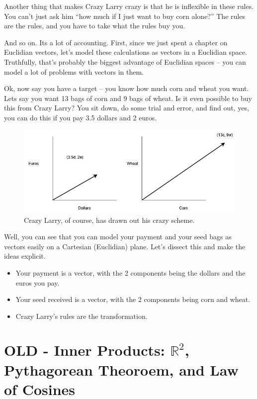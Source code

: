 \documentclass[
]{book}
\providecommand{\tightlist}{%
  \setlength{\itemsep}{0pt}\setlength{\parskip}{0pt}}
\begin{document}
Another thing that makes Crazy Larry crazy is that he is inflexible in these rules. You can't just ask him ``how much if I just want to buy corn alone?'' The rules are the rules, and you have to take what the rules buy you.

And so on. Its a lot of accounting. First, since we just spent a chapter on Euclidian vectors, let's model these calculations as vectors in a Euclidian space. Truthfully, that's probably the biggest advantage of Euclidian spaces -- you can model a lot of problems with vectors in them.

Ok, now say you have a target -- you know how much corn and wheat you want. Lets say you want 13 bags of corn and 9 bags of wheat. Is it even possible to buy this from Crazy Larry? You sit down, do some trial and error, and find out, yes, you can do this if you pay 3.5 dollars and 2 euros.

\begin{figure}

{\centering \includegraphics[width=0.75\linewidth,height=0.75\textheight]{images/CrazyCornWheat} 

}

\caption{Crazy Larry, of course, has drawn out his crazy scheme.}\label{fig:unnamed-chunk-6}
\end{figure}

Well, you can see that you can model your payment and your seed bags as vectors easily on a Cartesian (Euclidian) plane. Let's dissect this and make the ideas explicit.

\begin{itemize}
\tightlist
\item
  Your payment is a vector, with the 2 components being the dollars and the euros you pay.
\item
  Your seed received is a vector, with the 2 components being corn and wheat.
\item
  Crazy Larry's rules are the transformation.
\end{itemize}

\hypertarget{old---inner-products-mathbbr2-pythagorean-theoroem-and-law-of-cosines}{%
\chapter{\texorpdfstring{OLD - Inner Products: \(\mathbb{R}^2\), Pythagorean Theoroem, and Law of Cosines}{OLD - Inner Products: \textbackslash mathbb\{R\}\^{}2, Pythagorean Theoroem, and Law of Cosines}}\label{old---inner-products-mathbbr2-pythagorean-theoroem-and-law-of-cosines}}
\end{document}
